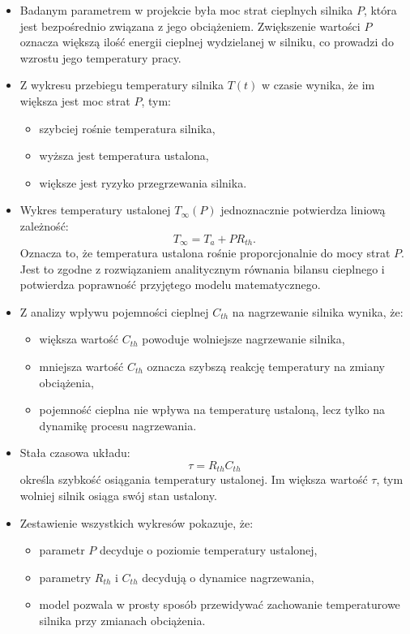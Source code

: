 \documentclass[a4paper,12pt]{article}
\begin{document}
	\begin{itemize}
		\item Badanym parametrem w projekcie była moc strat cieplnych silnika \(P\), która jest bezpośrednio związana z jego obciążeniem. Zwiększenie wartości \(P\) oznacza większą ilość energii cieplnej wydzielanej w silniku, co prowadzi do wzrostu jego temperatury pracy.
		
		\item Z wykresu przebiegu temperatury silnika \(T(t)\) w czasie wynika, że im większa jest moc strat \(P\), tym:
		\begin{itemize}
			\item szybciej rośnie temperatura silnika,
			\item wyższa jest temperatura ustalona,
			\item większe jest ryzyko przegrzewania silnika.
		\end{itemize}
		
		\item Wykres temperatury ustalonej \(T_\infty(P)\) jednoznacznie potwierdza liniową zależność:
		\[
		T_\infty = T_a + P R_{th}.
		\]
		Oznacza to, że temperatura ustalona rośnie proporcjonalnie do mocy strat \(P\). Jest to zgodne z rozwiązaniem analitycznym równania bilansu cieplnego i potwierdza poprawność przyjętego modelu matematycznego.
		
		\item Z analizy wpływu pojemności cieplnej \(C_{th}\) na nagrzewanie silnika wynika, że:
		\begin{itemize}
			\item większa wartość \(C_{th}\) powoduje wolniejsze nagrzewanie silnika,
			\item mniejsza wartość \(C_{th}\) oznacza szybszą reakcję temperatury na zmiany obciążenia,
			\item pojemność cieplna nie wpływa na temperaturę ustaloną, lecz tylko na dynamikę procesu nagrzewania.
		\end{itemize}
		
		\item Stała czasowa układu:
		\[
		\tau = R_{th} C_{th}
		\]
		określa szybkość osiągania temperatury ustalonej. Im większa wartość \(\tau\), tym wolniej silnik osiąga swój stan ustalony.
		
		\item Zestawienie wszystkich wykresów pokazuje, że:
		\begin{itemize}
			\item parametr \(P\) decyduje o poziomie temperatury ustalonej,
			\item parametry \(R_{th}\) i \(C_{th}\) decydują o dynamice nagrzewania,
			\item model pozwala w prosty sposób przewidywać zachowanie temperaturowe silnika przy zmianach obciążenia.
		\end{itemize}
		
	\end{itemize}
	
\end{document}
